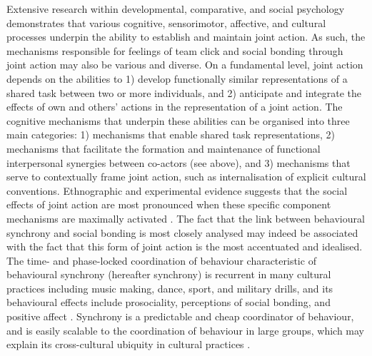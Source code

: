 Extensive research within developmental, comparative, and social psychology demonstrates that various cognitive, sensorimotor, affective, and cultural processes underpin the ability to establish and maintain joint action. As such, the mechanisms responsible for feelings of team click and social bonding through joint action may also be various and diverse.  On a fundamental level, joint action depends on the abilities to 1) develop functionally similar representations of a shared task between two or more individuals, and 2) anticipate and integrate the effects of own and others' actions in the representation of a joint action\citep{Sebanz2006a}.
The cognitive mechanisms that underpin these abilities can be organised into three main categories: 1) mechanisms that enable shared task representations, 2) mechanisms that facilitate the formation and maintenance of functional interpersonal synergies between co-actors (see above), and 3) mechanisms that serve to contextually frame joint action, such as internalisation of explicit cultural conventions\citep{Sebanz2006,Vesper2017}.  Ethnographic and experimental evidence suggests that the social effects of joint action are most pronounced when these specific component mechanisms are maximally activated \citep{Durkheim1965,McNeill1995,Mogan2017}. The fact that the link between behavioural synchrony and social bonding is most closely analysed may indeed be associated with the fact that this form of joint action is the most accentuated and idealised.
The time- and phase-locked coordination of behaviour characteristic of behavioural synchrony (hereafter synchrony) is recurrent in many cultural practices including music making, dance, sport, and military drills, and its behavioural effects include prosociality, perceptions of social bonding, and positive affect \citep{Mogan2017}.  Synchrony is a predictable and cheap coordinator of behaviour, and is easily scalable to the coordination of behaviour in large groups, which may explain its cross-cultural ubiquity in cultural practices \citep{Dunbar2010,Tarr2016}.

